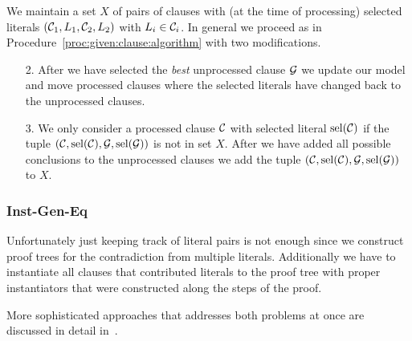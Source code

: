 \begin{procedure}
	We maintain a set \( X \) of pairs of clauses with (at the time of processing) selected literals
	\( (\mathcal{C}_1, L_1, \mathcal{C}_2, L_2) \) with \( L_i\in\mathcal{C}_i \).
	In general we proceed as in Procedure~\vref{proc:given:clause:algorithm}
	with two modifications.

	\begin{enumerate}
		\item[2.]
		After we have selected the \emph{best} unprocessed clause \( \mathcal{G} \)
		we update our model and move processed clauses where the selected literals have changed back to the unprocessed clauses.
		\item[3.]
		We only consider a processed clause \( \mathcal{C} \)
		with selected literal \( \operatorname{sel}(\mathcal{C}) \)
		if the tuple \( ( \mathcal{C}, \operatorname{sel}(\mathcal{C}), \mathcal{G}, \operatorname{sel}(\mathcal{G}) ) \)
		is not in set \( X \).
		After we have added all possible conclusions
		to the unprocessed clauses we add
		the tuple \( ( \mathcal{C}, \operatorname{sel}(\mathcal{C}), \mathcal{G}, \operatorname{sel}(\mathcal{G}) ) \) to \( X \).

	\end{enumerate}



\end{procedure}

\subsubsection{Inst-Gen-Eq}

Unfortunately just keeping track of literal pairs is not enough since we construct proof trees for the contradiction from multiple literals.
Additionally we have to instantiate all clauses that contributed literals
to the proof tree with proper instantiators that were constructed along the steps of the proof.

More sophisticated approaches that addresses both problems at once are discussed in detail in~\cite{CS2011PhD}.









